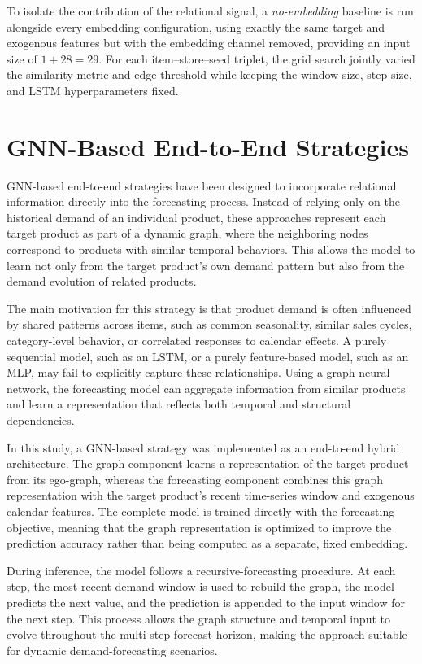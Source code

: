 To isolate the contribution of the relational signal, a \emph{no-embedding} baseline is run alongside every embedding configuration, using exactly the same target and exogenous features but with the embedding channel removed, providing an input size of \(1+28=29\). For each item--store--seed triplet, the grid search jointly varied the similarity metric and edge threshold while keeping the window size, step size, and LSTM hyperparameters fixed.


\section{GNN-Based End-to-End Strategies}

GNN-based end-to-end strategies have been designed to incorporate relational information directly into the forecasting process. Instead of relying only on the historical demand of an individual product, these approaches represent each target product as part of a dynamic graph, where the neighboring nodes correspond to products with similar temporal behaviors. This allows the model to learn not only from the target product's own demand pattern but also from the demand evolution of related products.

The main motivation for this strategy is that product demand is often influenced by shared patterns across items, such as common seasonality, similar sales cycles, category-level behavior, or correlated responses to calendar effects. A purely sequential model, such as an LSTM, or a purely feature-based model, such as an MLP, may fail to explicitly capture these relationships. Using a graph neural network, the forecasting model can aggregate information from similar products and learn a representation that reflects both temporal and structural dependencies.

In this study, a GNN-based strategy was implemented as an end-to-end hybrid architecture. The graph component learns a representation of the target product from its ego-graph, whereas the forecasting component combines this graph representation with the target product's recent time-series window and exogenous calendar features. The complete model is trained directly with the forecasting objective, meaning that the graph representation is optimized to improve the prediction accuracy rather than being computed as a separate, fixed embedding.

During inference, the model follows a recursive-forecasting procedure. At each step, the most recent demand window is used to rebuild the graph, the model predicts the next value, and the prediction is appended to the input window for the next step. This process allows the graph structure and temporal input to evolve throughout the multi-step forecast horizon, making the approach suitable for dynamic demand-forecasting scenarios.

